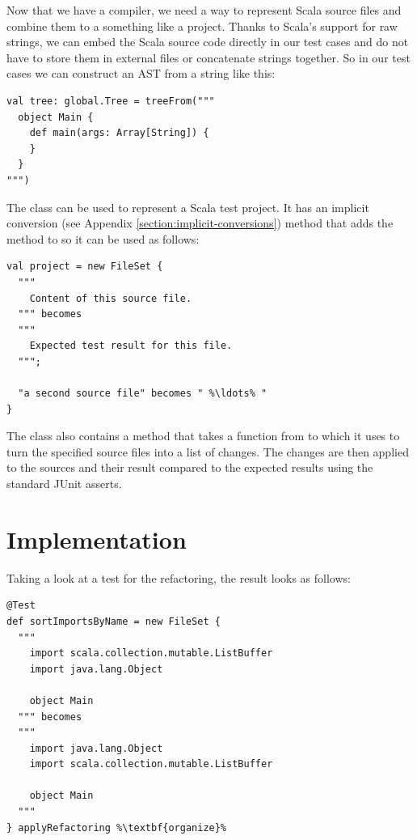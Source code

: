 \documentclass[10pt,a4paper,oneside]{scrreprt}
\begin{document}
Now that we have a compiler, we need a way to represent Scala source files and combine them to a something like a project. Thanks to Scala's support for raw strings, we can embed the Scala source code directly in our test cases and do not have to store them in external files or concatenate strings together. So in our test cases we can construct an AST from a string like this:

\begin{lstlisting}
val tree: global.Tree = treeFrom("""
  object Main {
    def main(args: Array[String]) {
    }
  }
""")
\end{lstlisting}

The  class can be used to represent a Scala test project. It has an implicit conversion (see Appendix \vref{section:implicit-conversions}) method that adds the  method to  so it can be used as follows:

\begin{lstlisting}
val project = new FileSet {
  """
    Content of this source file.
  """ becomes
  """
    Expected test result for this file.
  """;

  "a second source file" becomes " %\ldots% "
}
\end{lstlisting}

The  class also contains a method  that takes a function from  to  which it uses to turn the specified source files into a list of changes. The changes are then applied to the sources and their result compared to the expected results using the standard JUnit asserts.

\section{Implementation}

Taking a look at a test for the  refactoring, the result looks as follows:

\begin{lstlisting}
@Test
def sortImportsByName = new FileSet {
  """
    import scala.collection.mutable.ListBuffer
    import java.lang.Object

    object Main
  """ becomes
  """
    import java.lang.Object
    import scala.collection.mutable.ListBuffer

    object Main
  """
} applyRefactoring %\textbf{organize}%
\end{lstlisting}
\end{document}

